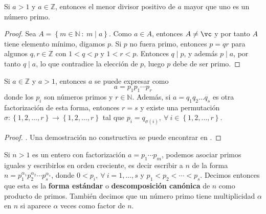 \begin{lemma}\label{lemma:pr1}
Si $a>1$ y $a\in \mathbb{Z}$, entonces el menor divisor positivo de $a$ mayor que uno es un número primo.
\end{lemma}
\begin{proof}
Sea $A=\left\{m\in\mathbb{N} \: : \: m \mid a\right\}$. Como $a\in A$, entonces $A\neq\vc$ y por tanto $A$ tiene elemento mínimo, digamos $p$. Si $p$ no fuera primo, entonces $p=qr$ para algunos $q,r\in \mathbb{Z}$ con $1<q<p$ y $1<r<p$. Entonces $q \mid p$, y además $p \mid a$, por tanto $q \mid a$, lo que contradice la elección de $p$, luego $p$ debe de ser primo.
\end{proof}

\begin{theorem}
Si $a\in \mathbb{Z}$ y $a>1$, entonces $a$ se puede expresar como
\begin{equation*}
	a=p_1 p_1\cdots p_r
\end{equation*}
donde los $p_i$ son números primos y $r\in\mathbb{N}$. Además, si $a=q_1 q_2\ldots q_s$ es otra factorización de esta forma, entonces $r=s$ y existe una permutación $\sigma: \left\{1,2,\ldots ,r\right\} \longrightarrow \left\{1,2,\ldots ,r\right\}$ tal que $p_i=q_{\sigma(i)}, \:\forall \: i\in \left\{1,2,\ldots ,r\right\}$.
\end{theorem}
\begin{proof}
\cite[\S I.2, pp. 23--24]{Zal1-2014}. Una demostración no constructiva se puede encontrar en \cite[\S 2.11, p. 26]{Har1-1979}.
\end{proof}

\begin{definition}
Si $n>1$ es un entero con factorización $a=p_1\cdots p_m$, podemos asociar primos iguales y escribirlos en orden creciente, es decir escribir a $n$ de la forma $n=p_1^{\alpha_1}p_2^{\alpha_2}\cdots p_s^{\alpha_s}$, donde $0<p_i,\:\forall \: i=1,\ldots ,s$ y $p_1<p_2<\cdots <p_s$. Decimos entonces que esta es la \textbf{forma estándar} o \textbf{descomposición canónica} de $n$ como producto de primos. También decimos que un número primo tiene multiplicidad $\alpha$ en $n$ si aparece $\alpha$ veces como factor de $n$.
\end{definition}

